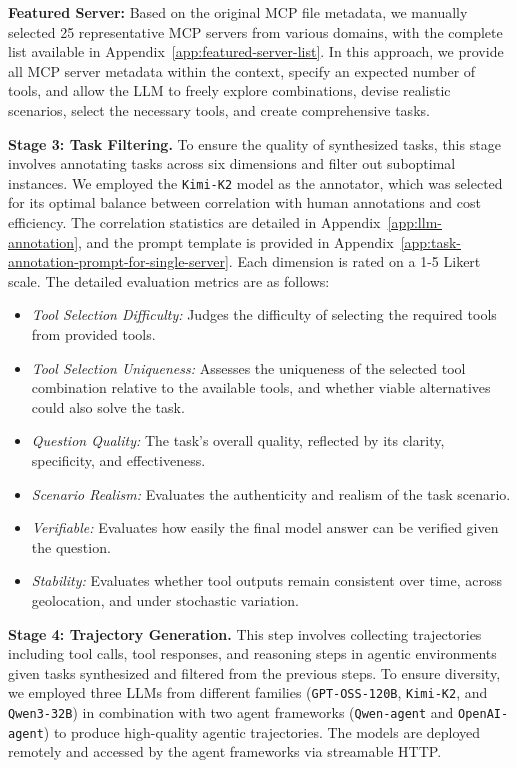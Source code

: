 \textbf{Featured Server:} Based on the original MCP file metadata, we manually selected 25 representative MCP servers from various domains, with the complete list available in Appendix~\ref{app:featured-server-list}. In this approach, we provide all MCP server metadata within the context, specify an expected number of tools, and allow the LLM to freely explore combinations, devise realistic scenarios, select the necessary tools, and create comprehensive tasks.

\textbf{\textcolor{orange!90!black}{Stage 3: Task Filtering.}} 
To ensure the quality of synthesized tasks, this stage involves annotating tasks across six dimensions and filter out suboptimal instances. We employed the \texttt{Kimi-K2} model as the annotator, which was selected for its optimal balance between correlation with human annotations and cost efficiency. The correlation statistics are detailed in Appendix~\ref{app:llm-annotation}, and the prompt template is provided in Appendix~\ref{app:task-annotation-prompt-for-single-server}. Each dimension is rated on a 1-5 Likert scale. The detailed evaluation metrics are as follows:

\begin{itemize}[itemsep=0pt, parsep=0pt, topsep=0pt, leftmargin=1em]
\item \textit{Tool Selection Difficulty:} Judges the difficulty of selecting the required tools from provided tools.
\item \textit{Tool Selection Uniqueness:} Assesses the uniqueness of the selected tool combination relative to the available tools, and whether viable alternatives could also solve the task.
\item \textit{Question Quality:} The task's overall quality, reflected by its clarity, specificity, and effectiveness.
\item \textit{Scenario Realism:} Evaluates the authenticity and realism of the task scenario.
\item \textit{Verifiable:} Evaluates how easily the final model answer can be verified given the question.
\item \textit{Stability:} Evaluates whether tool outputs remain consistent over time, across geolocation, and under stochastic variation.
\end{itemize}

\textbf{\textcolor{orange!90!black}{Stage 4: Trajectory Generation.}}
This step involves collecting trajectories including tool calls, tool responses, and reasoning steps in agentic environments given tasks synthesized and filtered from the previous steps. To ensure diversity, we employed three LLMs from different families (\texttt{GPT-OSS-120B}, \texttt{Kimi-K2}, and \texttt{Qwen3-32B}) in combination with two agent frameworks (\texttt{Qwen-agent} and \texttt{OpenAI-agent}) to produce high-quality agentic trajectories. The models are deployed remotely and accessed by the agent frameworks via streamable HTTP.

